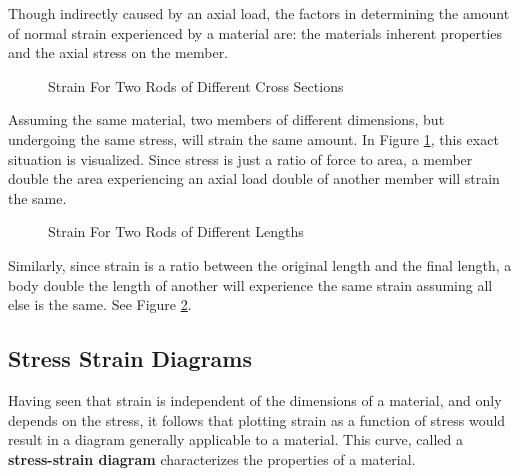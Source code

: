 \documentclass[12pt]{article}
\begin{document}
Though indirectly caused by an axial load, the factors in determining the amount of normal strain experienced by a material are: the materials inherent properties and the axial stress on the member.

\begin{figure}[H]
  \centering
  \begin{subfigure}[h]{0.45\textwidth}
    \centering
    
  \end{subfigure}
  \vrule
  \begin{subfigure}[h]{0.45\textwidth}
    \centering
    
  \end{subfigure}
  \caption{Strain For Two Rods of Different Cross Sections}
  \label{fig:015}
\end{figure}

Assuming the same material, two members of different dimensions, but undergoing the same stress, will strain the same amount. In Figure \ref{fig:015}, this exact situation is visualized. Since stress is just a ratio of force to area, a member double the area experiencing an axial load double of another member will strain the same.

\begin{figure}[H]
  \centering
  \begin{subfigure}[H]{\textwidth}
    \centering
    
  \end{subfigure}
  \begin{subfigure}[H]{\textwidth}
    \centering
    
  \end{subfigure}
  \caption{Strain For Two Rods of Different Lengths}
  \label{fig:strainForTwoRodsOfDifferentLengths}
\end{figure}

Similarly, since strain is a ratio between the original length and the final length, a body double the length of another will experience the same strain assuming all else is the same. See Figure \ref{fig:strainForTwoRodsOfDifferentLengths}.

\subsection{Stress Strain Diagrams}
\label{ssec:stressStrainDiagrams}

Having seen that strain is independent of the dimensions of a material, and only depends on the stress, it follows that plotting strain as a function of stress would result in a diagram generally applicable to a material. This curve, called a \textbf{stress-strain diagram} characterizes the properties of a material.
\end{document}
